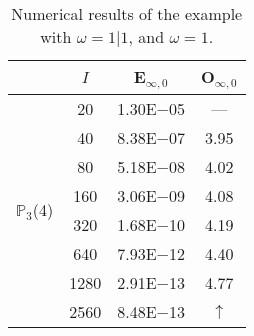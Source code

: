 \begin{table}[H]
\setlength{\tabcolsep}{5pt}
\centering
\caption{Numerical results of the example with $\omega=1|1$, and $\omega=1$.}
  \begin{tabular}{@{}l c c c@{}}
\toprule
 & $I$ & E$_{\infty,0}$ & O$_{\infty,0}$\\
\midrule
\multirow{8}{*}{$\mathbb{P}_{3}$(4)}
 & 20 & 1.30E$-$05 & ---\\
 & 40 & 8.38E$-$07 & 3.95\\
 & 80 & 5.18E$-$08 & 4.02\\
 & 160 & 3.06E$-$09 & 4.08\\
 & 320 & 1.68E$-$10 & 4.19\\
 & 640 & 7.93E$-$12 & 4.40\\
 & 1280 & 2.91E$-$13 & 4.77\\
 & 2560 & 8.48E$-$13 & $\uparrow$\\
\bottomrule
\end{tabular}
\label{Table:PRO:test_01_01_test27_pro1}
\end{table}
